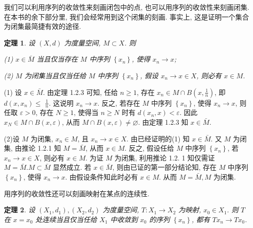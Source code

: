 \documentclass[openany]{ctexbook}
\makeatletter
\theoremstyle{kaiti}
\newtheorem{theorem}{定理}[section]
\theoremstyle{normal}
\renewenvironment{proof}[1][\proofname]{\par
    \pushQED{\qed}%
    \normalfont \topsep6\p@\@plus6\p@\relax
    \trivlist
    \item\relax
    {\heiti #1}\hspace{2\labelsep}\ignorespaces
  }{%
    \popQED\endtrivlist\@endpefalse
  }
\makeatother
\begin{document}
我们可以利用序列的收敛性来刻画闭包中的点, 也可以用序列的收敛性来刻画闭集. 在本书的余下部分里, 我们会经常用到这个闭集的刻画. 事实上, 这是证明一个集合为闭集最简捷有效的途径.

\begin{theorem}
  设 $(X, d)$ 为度量空间, $M \subset X$. 则

  (1) $x \in \bar{M}$ 当且仅当存在 $M$ 中序列 $\left\{x_n\right\}$, 使得 $x_n \rightarrow x$;

  (2) $M$ 为闭集当且仅当任给 $M$ 中序列 $\left\{x_n\right\}$, 假设 $x_n \rightarrow x \in X$, 则必有 $x \in M$. 
\end{theorem}

\begin{proof}
(1) 设 $x \in \bar{M}$. 由定理 1.2.3 可知, 任给 $n \geqslant 1$, 存在 $x_n \in M \cap B\left(x, \frac{1}{n}\right)$, 即 $d\left(x, x_n\right) \leqslant$ $\frac{1}{n}$. 这说明 $x_n \rightarrow x$.
反之, 若存在 $M$ 中序列 $\left\{x_n\right\}$, 使得 $x_n \rightarrow x$, 则任取 $\varepsilon>0$, 存在 $N \geqslant 1$, 使得当 $n \geqslant N$ 时有 $d\left(x_n, x\right)<\varepsilon$. 因此 $x_{N} \in M \cap B(x, \varepsilon)$, 从而 $M \cap B(x, \varepsilon) \neq \varnothing$. 由定理 1.2.3 知 $x \in \bar{M}$.

(2)设 $M$ 为闭集, $x_n \in M$, 且 $x_n \rightarrow x \in X$. 由已经证明的(1) 知 $x \in \bar{M}$. 又 $M$ 为闭集, 由推论 1.2.1 知 $M=\bar{M}$, 从而 $x \in M$.
反之, 假设任给 $M$ 中序列 $\left\{x_n\right\}$, 若 $x_n \rightarrow x \in X$, 则必有 $x \in M$. 为证 $M$ 为闭集, 利用推论 1.2. 1 知仅需证 $M=\bar{M}. M \subset \bar{M}$ 显然成立. 若 $x \in \bar{M}$, 则由已证的第一部分结论知, 存在 $M$ 中序列 $\left\{x_n\right\}$, 使得 $x_n \rightarrow x$. 由假设条件知此时必有 $x \in M$. 从而 $M=\bar{M}, M$ 为闭集.
\end{proof}

用序列的收敛性还可以刻画映射在某点的连续性.

\begin{theorem}
  设 $\left(X_1, d_1\right),\left(X_2, d_2\right)$ 为度量空间, $T: X_1 \rightarrow X_2$ 为映射, $x_0 \in X_1$. 则 $T$ 在 $x=x_0$ 处连续当且仅当任给 $X_1$ 中收敛到 $x_0$ 的序列 $\left\{x_n\right\}$, 都有 $T x_n \rightarrow T x_0$.
\end{theorem}
\end{document}
